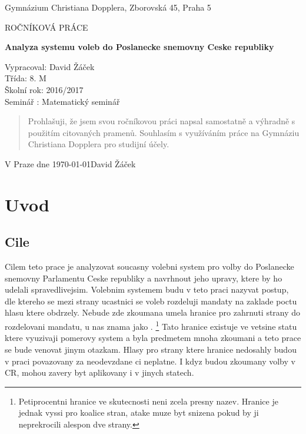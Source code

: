 \documentclass[12pt,a4paper]{scrreprt}
\begin{document}
\begin{titlepage}
	\begin{center}
	{\large Gymnázium Christiana Dopplera, Zborovská 45, Praha 5 \par}
	\vfill
	\par\vspace{1cm}
	{\scshape\LARGE ROČNÍKOVÁ PRÁCE \par}
	{\huge\bfseries Analyza systemu voleb do Poslanecke snemovny Ceske republiky\par}
	\vfill
\end{center}
Vypracoval: David Žáček \\
Třída: 8. M \\
Školní rok: 2016/2017 \\
Seminář : Matematický seminář \\
	\vfill
\end{titlepage}

\vspace*{\fill}
\begin{quote}
Prohlašuji, že jsem svou ročníkovou práci napsal samostatně a výhradně s
použitím 
citovaných pramenů. Souhlasím s
využíváním 
práce na Gymnáziu Christiana Dopplera 
pro studijní účely. \\
\end{quote}

V Praze dne \today \hfill David Žáček

\vspace*{\fill}
\thispagestyle{empty}
\newpage
\tableofcontents
\newpage
\chapter{Uvod}
\section{Cile}
Cilem teto prace je analyzovat soucasny volebni system  pro volby do Poslanecke snemovny Parlamentu Ceske republiky a navrhnout jeho upravy, ktere by ho udelali spravedlivejsim. 
Volebnim systemem budu v teto praci nazyvat postup, dle ktereho se mezi strany ucastnici se voleb rozdeluji mandaty na zaklade poctu hlasu ktere obdrzely. 
Nebude zde zkoumana umela hranice pro zahrnuti strany do rozdelovani mandatu, u nas znama jako .
\footnote{Petiprocentni hranice ve skutecnosti neni zcela presny nazev. Hranice je jednak vyssi pro koalice stran, atake muze byt snizena pokud by ji neprekrocili alespon dve strany.\autocite{ZAK}}
Tato hranice existuje ve vetsine statu ktere vyuzivaji pomerovy system a byla predmetem mnoha zkoumani a teto prace se bude venovat jinym otazkam.
Hlasy pro strany ktere hranice nedosahly budou v praci povazovany za neodevzdane ci neplatne.
I kdyz budou zkoumany volby v CR, mohou zavery byt aplikovany i v jinych statech. 
\end{document}
